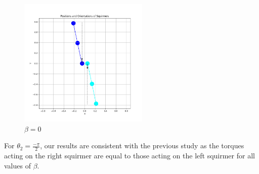 \documentclass{article}
\begin{document}
\begin{figure}[H]
    \centering
    \includegraphics[width=0.55\textwidth]{graphs/simulations/sim_sq_sq/beta0/mpi_2_.png}
    \caption{\footnotesize $\beta = 0$}
\end{figure}
For $\theta_2 = \frac{-\pi}{2}$, our results are consistent with the previous study\cite{Stark} as the torques acting on the right squirmer are equal to
those acting on the left squirmer for all values of $\beta$.
\end{document}
